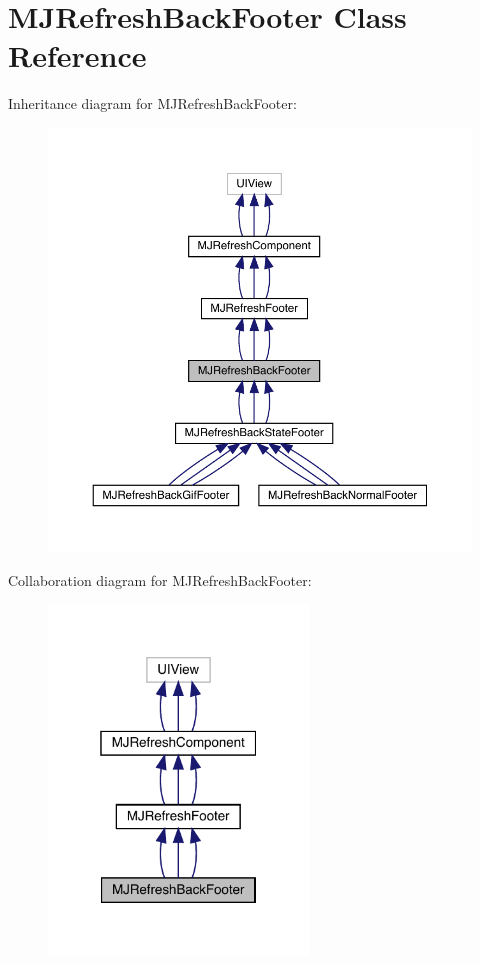 \hypertarget{interface_m_j_refresh_back_footer}{}\section{M\+J\+Refresh\+Back\+Footer Class Reference}
\label{interface_m_j_refresh_back_footer}


Inheritance diagram for M\+J\+Refresh\+Back\+Footer\+:\nopagebreak
\begin{figure}[H]
\begin{center}
\leavevmode
\includegraphics[width=350pt]{interface_m_j_refresh_back_footer__inherit__graph}
\end{center}
\end{figure}


Collaboration diagram for M\+J\+Refresh\+Back\+Footer\+:\nopagebreak
\begin{figure}[H]
\begin{center}
\leavevmode
\includegraphics[width=196pt]{interface_m_j_refresh_back_footer__coll__graph}
\end{center}
\end{figure}
